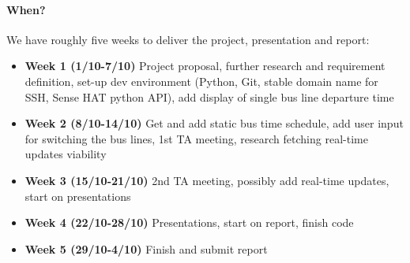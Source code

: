 \documentclass[oneside,a4paper]{paper}
\begin{document}
\paragraph{When?} We have roughly five weeks to deliver the project, presentation and report:

\begin{itemize}
	\item \textbf{Week 1 (1/10-7/10)} Project proposal, further research and requirement definition, set-up dev environment (Python, Git, stable domain name for SSH, Sense HAT python API), add display of single bus line departure time
	\item \textbf{Week 2 (8/10-14/10)} Get and add static bus time schedule, add user input for switching the bus lines, 1st TA meeting, research fetching real-time updates viability
	\item \textbf{Week 3 (15/10-21/10)} 2nd TA meeting, possibly add real-time updates, start on presentations
	\item \textbf{Week 4 (22/10-28/10)} Presentations, start on report, finish code
	\item \textbf{Week 5 (29/10-4/10)} Finish and submit report
\end{itemize}
\end{document}
